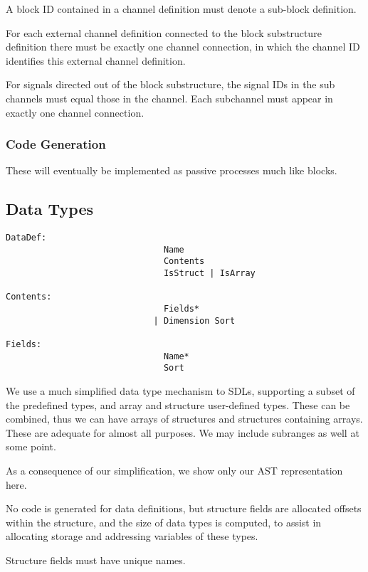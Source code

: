 A block ID contained in a channel definition must denote a sub-block
definition.

For each external channel definition connected to the block
substructure definition there must be exactly one channel connection,
in which the channel ID identifies this external channel definition.

For signals directed out of the block substructure, the signal IDs in
the sub channels must equal those in the channel. Each subchannel
must appear in exactly one channel connection.
\subsubsection{Code Generation}

These will eventually be implemented as passive processes much like
blocks.

\subsection{Data Types}

\begin{verbatim}
DataDef:
                               Name
                               Contents
                               IsStruct | IsArray

Contents:
                               Fields*
                             | Dimension Sort

Fields:
                               Name*
                               Sort
\end{verbatim}

We use a much simplified data type mechanism to SDLs, supporting a
subset of the predefined types, and array and structure user-defined
types. These can be combined, thus we can have arrays of structures
and structures containing arrays. These are adequate for almost all
purposes. We may include subranges as well at some point.

As a consequence of our simplification, we show only our AST 
representation here.

No code is generated for data definitions, but structure fields are
allocated offsets within the structure, and the size of data types is
computed, to assist in allocating storage and addressing variables
of these types.

Structure fields must have unique names.

